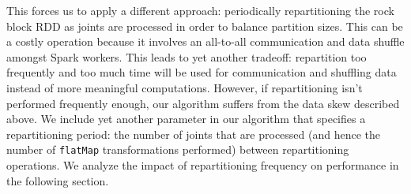 This forces us to apply a different approach: periodically repartitioning the rock block RDD as joints are processed in order to balance partition sizes. This can be a costly operation because it involves an all-to-all communication and data shuffle amongst Spark workers. This leads to yet another tradeoff: repartition too frequently and too much time will be used for communication and shuffling data instead of more meaningful computations. However, if repartitioning isn't performed frequently enough, our algorithm suffers from the data skew described above. We include yet another parameter in our algorithm that specifies a repartitioning period: the number of joints that are processed (and hence the number of \texttt{flatMap} transformations performed) between repartitioning operations. We analyze the impact of repartitioning frequency on performance in the following section.
